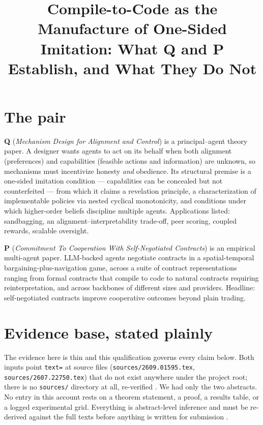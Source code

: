 \documentclass{article}
\title{Compile-to-Code as the Manufacture of One-Sided Imitation: What Q and P Establish, and What They Do Not}
\begin{document}
\maketitle

\section{The pair}

\textbf{Q} (\emph{Mechanism Design for Alignment and Control}) is a principal--agent theory paper. A designer wants agents to act on its behalf when both alignment (preferences) and capabilities (feasible actions and information) are unknown, so mechanisms must incentivize honesty \emph{and} obedience. Its structural premise is a one-sided imitation condition --- capabilities can be concealed but not counterfeited --- from which it claims a revelation principle, a characterization of implementable policies via nested cyclical monotonicity, and conditions under which higher-order beliefs discipline multiple agents. Applications listed: sandbagging, an alignment--interpretability trade-off, peer scoring, coupled rewards, scalable oversight.

\textbf{P} (\emph{Commitment To Cooperation With Self-Negotiated Contracts}) is an empirical multi-agent paper. LLM-backed agents negotiate contracts in a spatial-temporal bargaining-plus-navigation game, across a suite of contract representations ranging from formal contracts that compile to code to natural contracts requiring reinterpretation, and across backbones of different sizes and providers. Headline: self-negotiated contracts improve cooperative outcomes beyond plain trading.

\section{Evidence base, stated plainly}

The evidence here is thin and this qualification governs every claim below. Both inputs point \texttt{text=} at source files (\texttt{sources/2609.01595.tex}, \texttt{sources/2607.22750.tex}) that do not exist anywhere under the project root; there is no \texttt{sources/} directory at all, re-verified . We had only the two abstracts. No entry in this account rests on a theorem statement, a proof, a results table, or a logged experimental grid. Everything is abstract-level inference and must be re-derived against the full texts before anything is written for submission .
\end{document}

